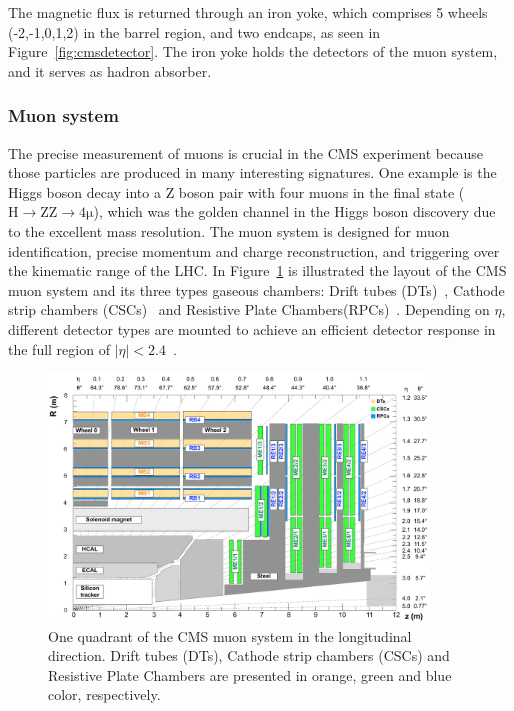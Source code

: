 The magnetic flux is returned through an iron yoke, which comprises 5 wheels (-2,-1,0,1,2) in the barrel region, and two endcaps, as seen in Figure~\ref{fig:cmsdetector}. The iron yoke holds the detectors of the muon system, and it serves as hadron absorber.

\subsubsection{Muon system}
The precise measurement of muons is crucial in the CMS experiment because those particles are produced in many interesting signatures. One example is the Higgs boson decay into a Z boson pair with four muons in the final state ($\mathrm{H\rightarrow ZZ\rightarrow4\mu}$), which was the golden channel in the Higgs boson discovery due to the excellent mass resolution. The muon system is designed for muon identification, precise momentum and charge reconstruction, and triggering over the kinematic range of the LHC. In Figure~\ref{fig:cmsmuonsystem} is illustrated the layout of the CMS muon system and its three types gaseous chambers: Drift tubes (DTs)~\cite{cmsdtscosmicrays}, Cathode strip chambers (CSCs)~\cite{cmscscscosmicrays} and Resistive Plate Chambers(RPCs)~\cite{cmsrpcscosmicrays}. Depending on $\eta$, different detector types are mounted to achieve an efficient detector response in the full region of $|\eta|<2.4$~\cite{CMS:2008xjf,CMS:2006myw}. 

\begin{figure}[ht!]
\centering
\includegraphics[width=0.9\textwidth]{Figures/Apparatus/cmsmuonsystem.pdf}
\caption[One quadrant of the CMS muon system in the longitudinal direction]{One quadrant of the CMS muon system in the longitudinal direction. Drift tubes (DTs), Cathode strip chambers (CSCs) and Resistive Plate Chambers are presented in orange, green and blue color, respectively.}
\label{fig:cmsmuonsystem}
\end{figure}

